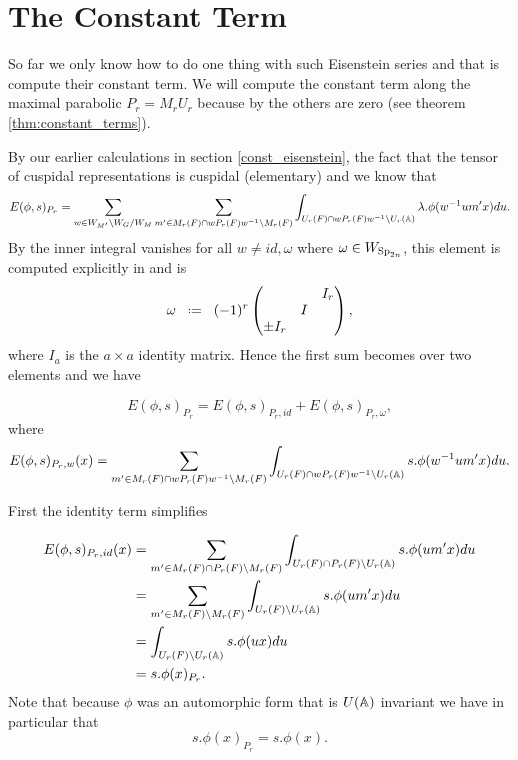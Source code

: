 \section{The Constant Term}
So far we only know how to do one thing with such Eisenstein series and that is compute their constant term. We will compute the constant term along the maximal parabolic \(P_r = M_rU_r\) because by \cite[II.1.7 (ii)]{moeglinSpectralDecompositionEisenstein1995} the others are zero (see theorem \ref{thm:constant_terms}).

By our earlier calculations in section \ref{const_eisenstein}, the fact that the tensor of cuspidal representations is cuspidal (elementary) and \cite{jiangPolesCertainResidual2013} we know that 
     \[E(\phi, s)_{P_r} = \sum_{ w\in W_{M'}\setminus W_G / W_{M}} \sum_{m'\in M_r(F)\cap wP_r(F)w\inv\setminus M_r(F)} \int_{U_r(F)\cap wP_r(F)w\inv \setminus U_r(\A)} \lambda.\phi( w\inv um' x)  du.\] 
     By \cite{jiangPolesCertainResidual2013} the inner integral vanishes for all \(w\neq id, \omega\) where \(\omega\in W_{\operatorname{Sp}_{2n}}\), this element is computed explicitly in \cite{ginzburgDescentMapAutomorphic2011} 
     and is 
     \[\omega \defeq (-1)^r\begin{pmatrix}
     	&& I_r\\
     	&I&\\
     	\pm I_r&&
     \end{pmatrix},\] 
     where \(I_a\) is the \(a\times a\) identity matrix. Hence the first sum becomes over two elements and we have 

     \[E(\phi, s)_{P_r} = E(\phi, s)_{P_r, id} + E(\phi, s)_{P_r, \omega},\]
     where 
     \[E(\phi, s)_{P_r, w}(x) =  \sum_{m'\in M_r(F)\cap wP_r(F)w\inv\setminus M_r(F)} \int_{U_r(F)\cap wP_r(F)w\inv \setminus U_r(\A)} s.\phi( w\inv um' x)  du.\]

First the identity term simplifies

     \begin{equation*}
        \begin{aligned}
            E(\phi, s)_{P_r, id} (x)&=  \sum_{m'\in M_r(F)\cap P_r(F)\setminus M_r(F)} \int_{U_r(F)\cap P_r(F) \setminus U_r(\A)} s.\phi( um' x)  du\\
            &= \sum_{m'\in M_r(F)\setminus M_r(F)} \int_{U_r(F)\setminus U_r(\A)} s.\phi( um' x)  du \\
            &=\int_{U_r(F)\setminus U_r(\A)} s.\phi( u x)  du \\
            &= s.\phi(x)_{P_r}.
        \end{aligned}
     \end{equation*}
     Note that because \(\phi\) was an automorphic form that is \(U(\A)\) invariant we have in particular that 
     \[s.\phi(x)_{P_r} = s.\phi(x).\]

